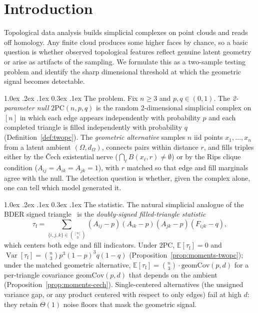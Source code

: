 \documentclass[reqno,12pt]{amsart}
\makeatletter
\renewcommand\paragraph{\@startsection{paragraph}{4}{\z@}%
  {1.0ex \@plus .2ex \@minus .1ex}%
  {0.3ex \@plus .1ex}%
  {\normalfont\normalsize\bfseries}}
\newcommand{\tauf}{\tau_{\mathrm{f}}}
\newcommand{\PC}{\mathrm{2PC}}
\newcommand{\geomCov}{\mathrm{geomCov}}
\newcommand{\EE}{\mathbb{E}}
\DeclareMathOperator{\Var}{Var}
\theoremstyle{plain}
\theoremstyle{definition}
\theoremstyle{remark}
\makeatother
\begin{document}
\maketitle

\section{Introduction}\label{sec:intro}

Topological data analysis builds simplicial complexes on point clouds and reads off
homology. Any finite cloud produces some higher faces by chance, so a basic question is
whether observed topological features reflect genuine latent geometry or arise as artifacts
of the sampling. We formulate this as a two-sample testing problem and identify the
sharp dimensional threshold at which the geometric signal becomes detectable.

\paragraph{The problem.}
Fix $n \ge 3$ and $p, q \in (0,1)$. The \emph{2-parameter null}
$\PC(n, p, q)$ is the random 2-dimensional simplicial complex on $[n]$ in which each edge
appears independently with probability $p$ and each completed triangle is filled
independently with probability $q$ (Definition~\ref{def:twopc}). The \emph{geometric
alternative} samples $n$ iid points $x_1, \dots, x_n$ from a latent ambient $(\Omega,
d_\Omega)$, connects pairs within distance $r$, and fills triples either by the \v{C}ech
existential nerve ($\bigcap_\ell B(x_\ell, r) \neq \emptyset$) or by the Rips clique
condition ($A_{ij} = A_{ik} = A_{jk} = 1$), with $r$ matched so that edge and fill
marginals agree with the null. The detection question is whether, given the complex
alone, one can tell which model generated it.

\paragraph{The statistic.}
The natural simplicial analogue of the BDER signed triangle~\cite{Bubeck2016} is the
\emph{doubly-signed filled-triangle statistic}
\[
  \tauf = \sum_{\{i,j,k\}\in\binom{[n]}{3}}
    (A_{ij} - p)(A_{ik} - p)(A_{jk} - p)(F_{ijk} - q),
\]
which centers both edge and fill indicators. Under $\PC$, $\EE[\tauf] = 0$ and
$\Var[\tauf] = \binom{n}{3} p^3 (1-p)^3 q(1-q)$ (Proposition~\ref{prop:moments-twopc});
under the matched geometric alternative, $\EE[\tauf] = \binom{n}{3} \cdot \geomCov(p, d)$
for a per-triangle covariance $\geomCov(p, d)$ that depends on the ambient
(Proposition~\ref{prop:moments-cech}). Single-centered alternatives (the unsigned
variance gap, or any product centered with respect to only edges) fail at high $d$:
they retain $\Theta(1)$ noise floors that mask the geometric signal.
\end{document}
